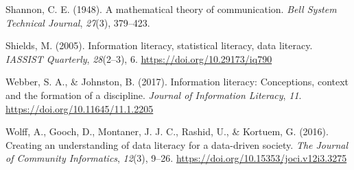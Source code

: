 \documentclass[
  12pt,
  a4paper,
  twoside]{article}
\newlength{\cslhangindent}
\newenvironment{CSLReferences}[2] %
 {\begin{list}{}{%
  \setlength{\itemindent}{0pt}
  \setlength{\leftmargin}{0pt}
  \setlength{\parsep}{0pt}
  \ifodd #1
   \setlength{\leftmargin}{\cslhangindent}
   \setlength{\itemindent}{-1\cslhangindent}
  \fi
  \setlength{\itemsep}{#2\baselineskip}}}
 {\end{list}}
\begin{document}
\begin{CSLReferences}{1}{0}
Shannon, C. E. (1948). A mathematical theory of communication. \emph{Bell System Technical Journal}, \emph{27}(3), 379--423.

Shields, M. (2005). Information literacy, statistical literacy, data literacy. \emph{IASSIST Quarterly}, \emph{28}(2--3), 6. \url{https://doi.org/10.29173/iq790}

Webber, S. A., \& Johnston, B. (2017). Information literacy: Conceptions, context and the formation of a discipline. \emph{Journal of Information Literacy}, \emph{11}. \url{https://doi.org/10.11645/11.1.2205}

Wolff, A., Gooch, D., Montaner, J. J. C., Rashid, U., \& Kortuem, G. (2016). Creating an understanding of data literacy for a data-driven society. \emph{The Journal of Community Informatics}, \emph{12}(3), 9--26. \url{https://doi.org/10.15353/joci.v12i3.3275}

\end{CSLReferences}
\end{document}
